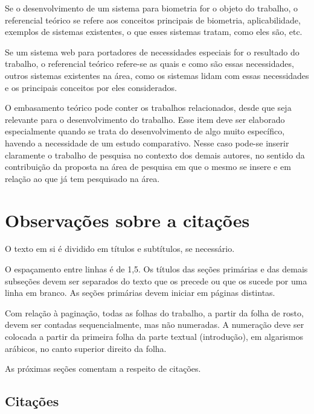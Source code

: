 Se o desenvolvimento de um sistema para biometria for o objeto do trabalho, o referencial teórico se refere aos conceitos principais de biometria, aplicabilidade, exemplos de sistemas existentes, o que esses sistemas tratam, como eles são, etc.

Se um sistema web para portadores de necessidades especiais for o resultado do trabalho, o referencial teórico refere-se as quais e como são essas necessidades, outros sistemas existentes na área, como os sistemas lidam com essas necessidades e os principais conceitos por eles considerados.

O embasamento teórico pode conter os trabalhos relacionados, desde que seja relevante para o desenvolvimento do trabalho. Esse item deve ser elaborado especialmente quando se trata do desenvolvimento de algo muito específico, havendo a necessidade de um estudo comparativo. Nesse caso pode-se inserir claramente o trabalho de pesquisa no contexto dos demais autores, no sentido da contribuição da proposta na área de pesquisa em que o mesmo se insere e em relação ao que já tem pesquisado na área. 


\section{Observações sobre a citações}\label{sec:formatacaoTexto}

O texto em si é dividido em títulos e subtítulos, se necessário. 

O espaçamento entre linhas é de 1,5. Os títulos das seções primárias e das demais subseções devem ser separados do texto que os precede ou que os sucede por uma linha em branco. As seções primárias devem iniciar em páginas distintas.

Com relação à paginação, todas as folhas do trabalho, a partir da folha de rosto, devem ser contadas sequencialmente, mas não numeradas. A numeração deve ser colocada a partir da primeira folha da parte textual (introdução), em algarismos arábicos, no canto superior direito da folha.


As próximas seções comentam a respeito de citações.

\subsection{Citações}\label{subsec:citacoes}

